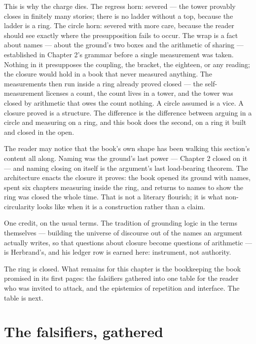 This is why the charge dies. The regress horn: severed --- the tower provably
closes in finitely many stories; there is no ladder without a top, because the
ladder is a ring. The circle horn: severed with more care, because the reader
should see exactly where the presupposition fails to occur. The wrap is a fact
about names --- about the ground's two boxes and the arithmetic of sharing ---
established in Chapter 2's grammar before a single measurement was taken. Nothing
in it presupposes the coupling, the bracket, the eighteen, or any reading; the
closure would hold in a book that never measured anything. The measurements then
run inside a ring already proved closed --- the self-measurement licenses a
count, the count lives in a tower, and the tower was closed by arithmetic that
owes the count nothing. A circle assumed is a vice. A closure proved is a
structure. The difference is the difference between arguing in a circle and
measuring on a ring, and this book does the second, on a ring it built and
closed in the open.

The reader may notice that the book's own shape has been walking this section's
content all along. Naming was the ground's last power --- Chapter 2 closed on it
--- and naming closing on itself is the argument's last load-bearing theorem.
The architecture enacts the closure it proves: the book opened its ground with
names, spent six chapters measuring inside the ring, and returns to names to
show the ring was closed the whole time. That is not a literary flourish; it is
what non-circularity looks like when it is a construction rather than a claim.

One credit, on the usual terms. The tradition of grounding logic in the terms
themselves --- building the universe of discourse out of the names an argument
actually writes, so that questions about closure become questions of arithmetic
--- is Herbrand's, and his ledger row is earned here: instrument, not authority.

The ring is closed. What remains for this chapter is the bookkeeping the book
promised in its first pages: the falsifiers gathered into one table for the
reader who was invited to attack, and the epistemics of repetition and
interface. The table is next.

\section{The falsifiers, gathered}

